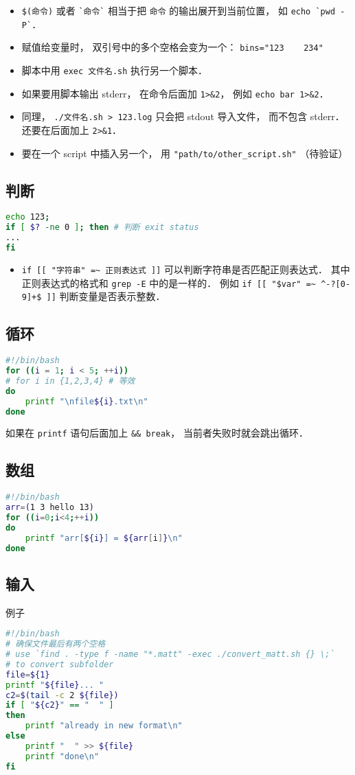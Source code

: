 \begin{itemize}
\item \verb|$(命令)| 或者 \verb|`命令`| 相当于把 \verb|命令| 的输出展开到当前位置， 如 \verb|echo `pwd -P`|．
\item 赋值给变量时， 双引号中的多个空格会变为一个： \verb|bins="123    234"|
\item 脚本中用 \verb|exec 文件名.sh| 执行另一个脚本．
\item 如果要用脚本输出 stderr， 在命令后面加 \verb|1>&2|， 例如 \verb|echo bar 1>&2|．
\item 同理， \verb|./文件名.sh > 123.log| 只会把 stdout 导入文件， 而不包含 stderr． 还要在后面加上 \verb|2>&1|．
\item 要在一个 script 中插入另一个， 用 \verb|"path/to/other_script.sh"| （待验证）
\end{itemize}

\subsection{判断}
\begin{lstlisting}[language=bash]
echo 123;
if [ $? -ne 0 ]; then # 判断 exit status
...
fi
\end{lstlisting}
\begin{itemize}
\item \verb|if [[ "字符串" =~ 正则表达式 ]]| 可以判断字符串是否匹配正则表达式． 其中正则表达式的格式和 \verb|grep -E| 中的是一样的． 例如 \verb|if [[ "$var" =~ ^-?[0-9]+$ ]]| 判断变量是否表示整数．
\end{itemize}

\subsection{循环}
\begin{lstlisting}[language=bash]
#!/bin/bash
for ((i = 1; i < 5; ++i))
# for i in {1,2,3,4} # 等效
do
	printf "\nfile${i}.txt\n"
done
\end{lstlisting}
如果在 \verb|printf| 语句后面加上 \verb|&& break|， 当前者失败时就会跳出循环．

\subsection{数组}
\begin{lstlisting}[language=bash]
#!/bin/bash
arr=(1 3 hello 13)
for ((i=0;i<4;++i))
do
    printf "arr[${i}] = ${arr[i]}\n"
done
\end{lstlisting}


\subsection{输入}
例子
\begin{lstlisting}[language=bash]
#!/bin/bash
# 确保文件最后有两个空格
# use `find . -type f -name "*.matt" -exec ./convert_matt.sh {} \;`
# to convert subfolder
file=${1}
printf "${file}... "
c2=$(tail -c 2 ${file})
if [ "${c2}" == "  " ]
then
	printf "already in new format\n"
else
	printf "  " >> ${file}
	printf "done\n"
fi
\end{lstlisting}

